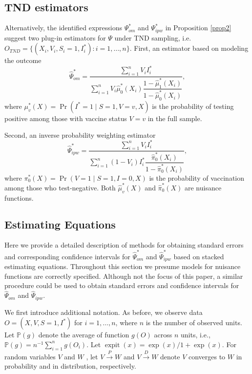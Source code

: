 \begin{appendix}
    \subsection{TND estimators}
    Alternatively, the identified expressions $\Psi^*_{om}$ and $\Psi^*_{ipw}$ in Proposition \ref{prop2} suggest two plug-in estimators for $\Psi$ under TND sampling, i.e. $O_{TND} = \{(X_i, V_i, S_i=1, I^*_i) : i = 1, \ldots, n\}$. First, an estimator based on modeling the outcome
    \begin{equation}\label{eqn:om_estimator_tnd}
        \widehat{\Psi}_{om}^* = \dfrac{\sum_{i=1}^n V_i I^*_i}{\sum_{i=1}^n V_i \widehat{\mu}^*_0(X_i)\dfrac{1 - \widehat{\mu}^*_1(X_i)}{1 - \widehat{\mu}^*_0(X_i)}},
    \end{equation}
    where $\mu^*_v(X) = \Pr(I^*=1 \mid S=1, V=v, X)$ is the probability of testing positive among those with vaccine status $V = v$ in the full sample.

    Second, an inverse probability weighting estimator
    \begin{equation}\label{eqn:ipw_estimator_tnd}
        \widehat{\Psi}_{ipw}^* = \dfrac{\sum_{i=1}^n V_i I^*_i}{\sum_{i=1}^n (1 - V_i) I^*_i \dfrac{\widehat{\pi}_0^*(X_i)}{1 - \widehat{\pi}_0^*(X_i)}},
    \end{equation}
    where $\pi^*_0(X) = \Pr(V=1\mid S=1, I=0, X)$ is the  probability of vaccination among those who test-negative. Both $\widehat{\mu}^*_v(X)$ and $\widehat{\pi}^*_0(X)$ are nuisance functions. 
    \newpage

    \subsection{Estimating Equations}
    Here we provide a detailed description of methods for obtaining standard errors and corresponding confidence intervals for $\widehat{\Psi}_{om}^*$ and $\widehat{\Psi}_{ipw}^*$ based on stacked estimating equations. Throughout this section we presume models for nuisance functions are correctly specified. Although not the focus of this paper, a similar procedure could be used to obtain standard errors and confidence intervals for $\widehat{\Psi}_{om}$ and $\widehat{\Psi}_{ipw}$.

    We first introduce additional notation. As before, we observe data $O = (X, V, S=1, I^*)$ for $i = 1, \ldots, n$, where $n$ is the number of observed units. Let $\mathbb{P}(g)$ denote the average of function $g(O)$  across $n$ units, i.e., $\mathbb{P}(g) = n^{-1}\sum_{i=1}^n g(O_{i})$. Let $\operatorname{expit}(x) = \exp(x)/{1 + \exp(x)}$. For  random variables $V$ and $W$ , let $V \overset{P}{\rightarrow} W$ and $V \overset{D}{\rightarrow} W$ denote $V$ converges to $W$ in probability and in distribution, respectively.


\end{appendix}
